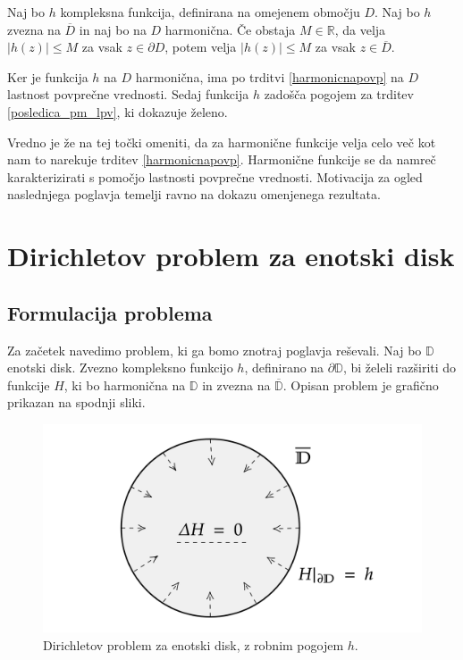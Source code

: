 \documentclass[mat1, tisk]{fmfdelo}
\begin{document}
    \begin{posledica}
        Naj bo $h$ kompleksna funkcija, definirana na omejenem območju $D$. Naj bo $h$ zvezna na $\overline{D}$ in naj bo na $D$ harmonična. 
        Če obstaja $M \in \mathbb{R}$, da velja $|h(z)| \leq M$ za vsak $z \in \partial D$, potem velja $|h(z)| \leq M$ za vsak $z \in \overline{D}$. 
    \end{posledica}
    \begin{dokaz}
        Ker je funkcija $h$ na $D$ harmonična, ima po trditvi \ref{harmonicnapovp} na $D$ lastnost povprečne vrednosti. Sedaj funkcija $h$ zadošča pogojem za trditev \ref{posledica_pm_lpv}, ki dokazuje želeno.
    \end{dokaz}

    Vredno je že na tej točki omeniti, da za harmonične funkcije velja celo več kot nam to narekuje trditev \ref{harmonicnapovp}. 
    Harmonične funkcije se da namreč karakterizirati s pomočjo lastnosti povprečne vrednosti. 
    Motivacija za ogled naslednjega poglavja temelji ravno na dokazu omenjenega rezultata. 

\section{Dirichletov problem za enotski disk}
\subsection{Formulacija problema}
    Za začetek navedimo problem, ki ga bomo znotraj poglavja reševali.
    Naj bo $\mathbb{D}$ enotski disk. Zvezno kompleksno funkcijo $h$, definirano na $\partial \mathbb{D}$, bi želeli razširiti do funkcije $H$, ki bo harmonična na $\mathbb{D}$ in zvezna na $\overline{\mathbb{D}}$.
    Opisan problem je grafično prikazan na spodnji sliki. 
    \begin{figure}[H]
        \begin{center}
            \includegraphics[width = 0.7 \textwidth]{dirichlet_form.png}
            \caption{Dirichletov problem za enotski disk, z robnim pogojem $h$.}
        \end{center}    
    \end{figure}
\end{document}
